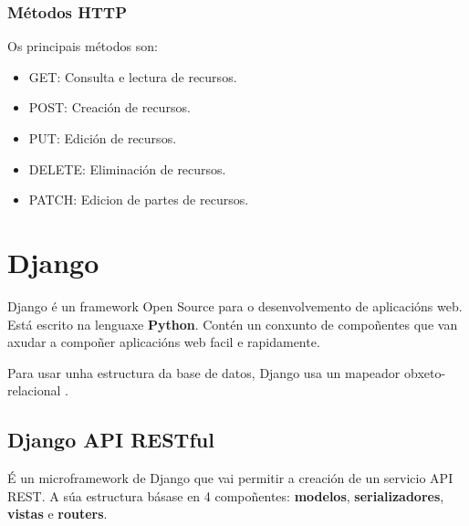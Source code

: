 \documentclass[11pt,twoside]{book}
\begin{document}
\subsubsection{Métodos HTTP}

Os principais métodos son:

\begin{itemize}
    \item GET: Consulta e lectura de recursos.
    \item POST: Creación de recursos.
    \item PUT: Edición de recursos.
    \item DELETE: Eliminación de recursos.
    \item PATCH: Edicion de partes de recursos.
\end{itemize}

\section{Django}

Django é un framework Open Source para o desenvolvemento de aplicacións web. Está escrito na lenguaxe \textbf{Python}. Contén un conxunto de compoñentes que van axudar a compoñer aplicacións web facil e rapidamente.

Para usar unha estructura da base de datos, Django usa un mapeador obxeto-relacional \cite{DjangoDoc}.


\subsection{Django API RESTful}

É un microframework de Django que vai permitir a creación de un servicio API REST. A súa estructura básase en 4 compoñentes: \textbf{modelos}, \textbf{serializadores}, \textbf{vistas} e \textbf{routers}.
\end{document}
